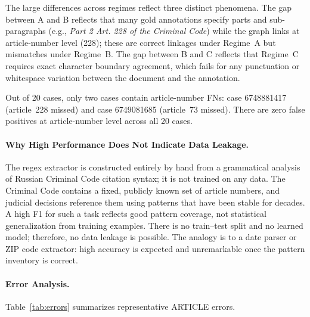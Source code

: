 \documentclass[11pt]{article}
\begin{document}
The large differences across regimes reflect three distinct phenomena. The gap between A and B reflects that many gold annotations specify parts and sub-paragraphs (e.g., \textit{Part 2 Art. 228 of the Criminal Code}) while the graph links at article-number level (228); these are correct linkages under Regime~A but mismatches under Regime~B. The gap between B and C reflects that Regime~C requires exact character boundary agreement, which fails for any punctuation or whitespace variation between the document and the annotation.

Out of 20 cases, only two cases contain article-number FNs: case 6748881417 (article~228 missed) and case 6749081685 (article~73 missed). There are zero false positives at article-number level across all 20 cases.

\paragraph{Why High Performance Does Not Indicate Data Leakage.}

The regex extractor is constructed entirely by hand from a grammatical analysis of Russian Criminal Code citation syntax; it is not trained on any data. The Criminal Code contains a fixed, publicly known set of article numbers, and judicial decisions reference them using patterns that have been stable for decades. A high F1 for such a task reflects good pattern coverage, not statistical generalization from training examples. There is no train--test split and no learned model; therefore, no data leakage is possible. The analogy is to a date parser or ZIP code extractor: high accuracy is expected and unremarkable once the pattern inventory is correct.

\paragraph{Error Analysis.}

Table~\ref{tab:errors} summarizes representative ARTICLE errors.
\end{document}
